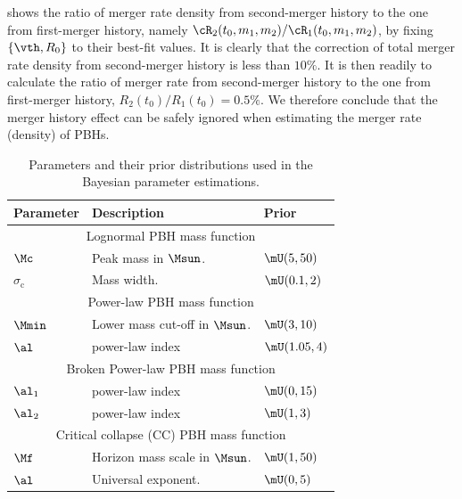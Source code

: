 \documentclass[
reprint,           %
superscriptaddress,%
amsmath,           %
amssymb,           %
aps,               %
prd,               %
notitlepage,       %
longbibliography,  %
floatfix,          %
showkeys,          %
]{revtex4-1}
\def\[{\left[}
\begin{document}
 shows the ratio of merger rate density from second-merger history
to the one from first-merger history, namely 
$\cR_2(t_0, m_1, m_2)/\cR_1(t_0, m_1, m_2)$, by fixing $\{\vth, R_0\}$ to their best-fit values.
It is clearly that the correction of total merger rate density from 
second-merger history is less than $10\%$.
It is then readily to calculate the ratio of merger rate from 
second-merger history to the one from first-merger history, 
$R_2(t_0)/R_1(t_0) = 0.5\%$.
We therefore conclude that the merger history effect can be safely ignored
when estimating the merger rate (density) of PBHs.

\begin{table}[htbp!]
	\centering
	\begin{tabular}{lll}
		\hline\hline
		\textbf{Parameter\quad} & \textbf{Description} & \textbf{Prior} \\
		\hline
		\multicolumn{3}{c}{Lognormal PBH mass function} \\[1pt]
		$\Mc$ & Peak mass in $\Msun$. & $\mU(5, 50)$\\
		$\sigma_\mathrm{c}$ & Mass width. & $\mU(0.1, 2)$\\
		\hline
		\multicolumn{3}{c}{Power-law PBH mass function} \\[1pt]
		$\Mmin$ & Lower mass cut-off in $\Msun$. & $\mU(3, 10)$\\
		$\al$ & power-law index & $\mU(1.05, 4)$\\
		\hline
		\multicolumn{3}{c}{Broken Power-law PBH mass function} \\[1pt]
		$\al_1$ & power-law index & $\mU(0, 15)$\\
		$\al_2$ & power-law index & $\mU(1, 3)$\\
		\hline
		\multicolumn{3}{c}{Critical collapse (CC) PBH mass function} \\[1pt]
		$\Mf$ & Horizon mass scale in $\Msun$. & $\mU(1, 50)$\\
		$\al$ & Universal exponent. & $\mU(0, 5)$\\
		\hline
	\end{tabular}
	\label{tab:priors}
	\caption{Parameters and their prior distributions used in the Bayesian parameter estimations.}
\end{table}
\end{document}
